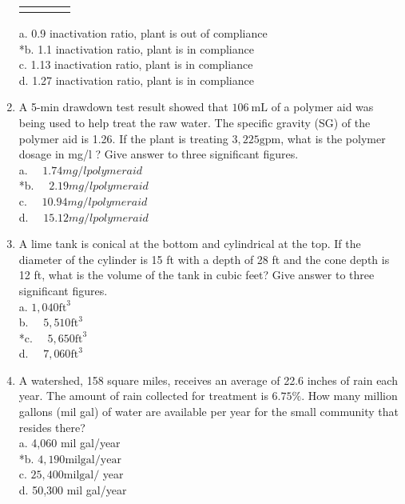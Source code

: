 \begin{enumerate}
\begin{center}
\begin{tabular}{|l|c|c|c|}
\hline\\
\end{tabular}
\end{center}
a. 0.9 inactivation ratio, plant is out of compliance\\
*b. 1.1 inactivation ratio, plant is in compliance\\
c. 1.13 inactivation ratio, plant is in compliance\\
d. 1.27 inactivation ratio, plant is in compliance\\
  \item A 5-min drawdown test result showed that $106 \mathrm{~mL}$ of a polymer aid was being used to help treat the raw water. The specific gravity (SG) of the polymer aid is 1.26. If the plant is treating $3,225 \mathrm{gpm}$, what is the polymer dosage in mg/l ? Give answer to three significant figures.\\
a. $\quad 1.74 mg/l polymer aid$\\
*b. $\quad 2.19 mg/l polymer aid$\\
c. $\quad 10.94 mg/l polymer aid$\\
d. $\quad 15.12 mg/l polymer aid$\\
  \item A lime tank is conical at the bottom and cylindrical at the top. If the diameter of the cylinder is 15 ft with a depth of 28 ft and the cone depth is 12 ft, what is the volume of the tank in cubic feet? Give answer to three significant figures.\\
a. $1,040 \mathrm{ft}^{3}$\\
b. $\quad 5,510 \mathrm{ft}^{3}$\\
*c. $\quad 5,650 \mathrm{ft}^{3}$\\
d. $\quad 7,060 \mathrm{ft}^{3}$\\
  \item A watershed, 158 square miles, receives an average of 22.6 inches of rain each year. The amount of rain collected for treatment is $6.75 \%$. How many million gallons (mil gal) of water are available per year for the small community that resides there?\\
a. 4,060 mil gal/year\\
*b. $4,190 \mathrm{mil} \mathrm{gal} / \mathrm{year}$\\
c. $25,400 \mathrm{mil} \mathrm{gal} /$ year\\
d. 50,300 mil gal/year 


\end{enumerate}
